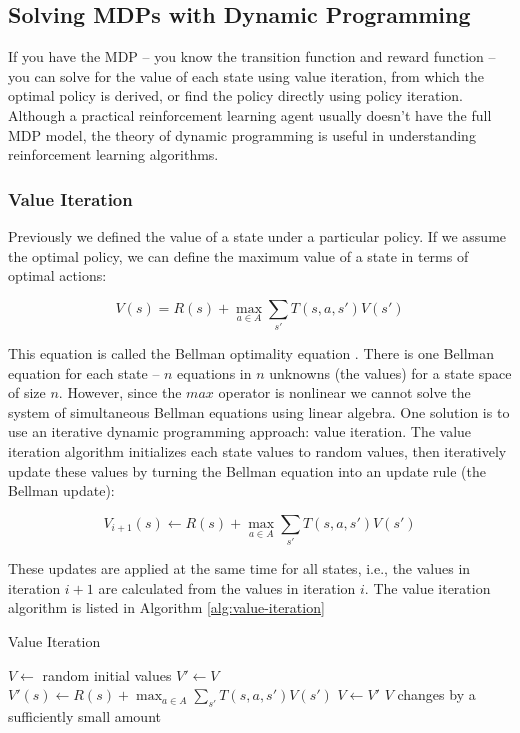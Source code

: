 \subsection{Solving MDPs with Dynamic Programming}

If you have the MDP -- you know the transition function and reward function -- you can solve for the value of each state using value iteration, from which the optimal policy is derived, or find the policy directly using policy iteration. Although a practical reinforcement learning agent usually doesn't have the full MDP model, the theory of dynamic programming is useful in understanding reinforcement learning algorithms.

\subsubsection{Value Iteration}

Previously we defined the value of a state under a particular policy. If we assume the optimal policy, we can define the maximum value of a state in terms of optimal actions:

\begin{equation}\label{eqn:bellman-equation}
V(s) = R(s) + \max_{a \in A} \sum_{s'} T(s, a, s') V(s')
\end{equation}

This equation is called the Bellman optimality equation \cite{bellman1957dynamic,bertsekas2012dynamic}. There is one Bellman equation for each state -- $n$ equations in $n$ unknowns (the values) for a state space of size $n$. However, since the $max$ operator is nonlinear we cannot solve the system of simultaneous Bellman equations using linear algebra. One solution is to use an iterative dynamic programming approach: value iteration. The value iteration algorithm initializes each state values to random values, then iteratively update these values by turning the Bellman equation into an update rule (the Bellman update):

\begin{equation}\label{eqn:bellman-update}
V_{i+1}(s) \leftarrow R(s) + \max_{a \in A} \sum_{s'} T(s, a, s') V(s')
\end{equation}

These updates are applied at the same time for all states, i.e., the values in iteration $i+1$ are calculated from the values in iteration $i$. The value iteration algorithm is listed in Algorithm \ref{alg:value-iteration}


\begin{algorithm}
  \caption{Value Iteration}\label{alg:value-iteration}
  \begin{algorithmic}
    \State $V \gets$ random initial values
    \Repeat
      \State $V' \gets V$
        \State $V'(s) \gets R(s) + \max_{a \in A} \sum_{s'} T(s, a, s') V(s')$
      \EndFor
      \State $V \gets V'$
    \Until $V$ changes by a sufficiently small amount
  \end{algorithmic}
\end{algorithm}

